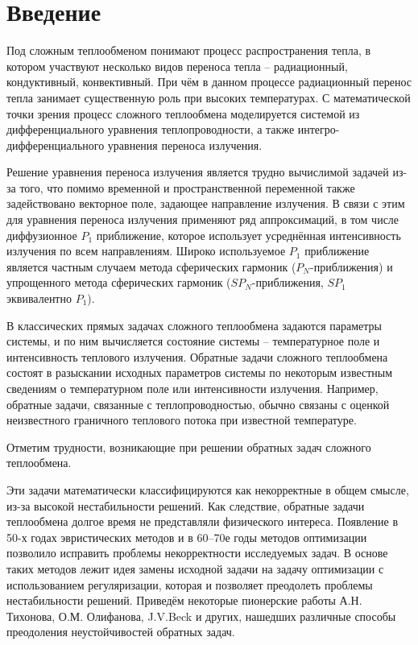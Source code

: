 \section{Введение}
Под сложным теплообменом понимают процесс распространения тепла,
в котором участвуют несколько видов переноса тепла – радиационный, кондуктивный, конвективный.
При чём в данном процессе радиационный перенос тепла занимает существенную роль при высоких температурах.
С математической точки зрения процесс сложного теплообмена моделируется системой из
дифференциального уравнения теплопроводности, а также интегро-дифференциального уравнения переноса излучения.


Решение уравнения переноса излучения является трудно вычислимой задачей из-за того,
что помимо временной и пространственной переменной также задействовано
векторное поле, задающее направление излучения.
В связи с этим для уравнения переноса излучения применяют ряд аппроксимаций,
в том числе диффузионное $P_1$ приближение, которое использует
усреднённая интенсивность излучения по всем направлениям.
Широко используемое $P_1$ приближение является частным случаем метода сферических
гармоник ($P_N$-приближения) и упрощенного метода сферических гармоник
($SP_N$-приближения, $SP_1$ эквивалентно $P_1$).


В классических прямых задачах сложного теплообмена задаются параметры системы, и по ним вычисляется
состояние системы – температурное поле и интенсивность теплового излучения.
Обратные задачи сложного теплообмена состоят в разыскании исходных параметров системы по некоторым
известным сведениям о температурном поле или интенсивности излучения.
Например, обратные задачи, связанные с теплопроводностью, обычно связаны с
оценкой неизвестного граничного теплового потока при известной температуре.


Отметим трудности, возникающие при решении обратных задач сложного теплообмена.


Эти задачи математически классифицируются как некорректные в общем смысле, из-за высокой нестабильности решений.
Как следствие, обратные задачи теплообмена долгое время не представляли физического интереса.
Появление в 50-х годах эвристических методов и в 60–70е годы методов оптимизации
позволило исправить проблемы некорректности исследуемых задач.
В основе таких методов лежит идея замены исходной задачи на задачу оптимизации
с использованием регуляризации, которая и позволяет преодолеть проблемы нестабильности решений.
Приведём некоторые пионерские работы А.Н. Тихонова, О.М. Олифанова, J.V.Beck и других, нашедших различные способы
преодоления неустойчивостей обратных задач.


